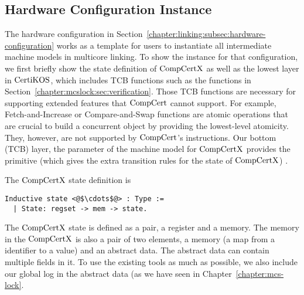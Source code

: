 
\subsection{Hardware Configuration Instance}
\label{chapter:certikos:subsec:hardware-configuration-instance}

The hardware configuration in Section~\ref{chapter:linking:subsec:hardware-configuration} works as a 
template for users to instantiate all intermediate machine models in multicore linking. 
To show the instance for that configuration,
we first briefly show the state definition of $\mathrm{CompCertX}$
as well as the lowest layer in $\mathrm{CertiKOS}$, which includes TCB functions such as the functions in Section~\ref{chapter:mcslock:sec:verification}.
Those TCB functions are 
necessary for supporting extended features that $\mathrm{CompCert}$ cannot support. 
For example, 
Fetch-and-Increase or Compare-and-Swap functions are atomic operations that are crucial to build a 
concurrent object by providing the lowest-level atomicity. 
They, however, are not supported by $\mathrm{CompCert}$'s instructions.
Our bottom (TCB) layer, the parameter of the machine model for $\mathrm{CompCertX}$ 
provides the primitive (which gives the extra transition rules for the state of $\mathrm{CompCertX}$) . 
%
%



The $\mathrm{CompCertX}$ state definition is
\begin{lstlisting}
Inductive state <@$\cdots$@> : Type :=
  | State: regset -> mem -> state.
\end{lstlisting}
The $\mathrm{CompCertX}$ state is defined as a pair, 
a register and a memory. 
The memory in the $\mathrm{CompCertX}$ is also a pair of two elements, 
a memory (a map from a identifier to a value) and an abstract data. 
The abstract data can contain 
multiple fields in it. 
To use the existing tools as much as possible, 
we also include our global log in the abstract data (as we have seen in Chapter~\ref{chapter:mcs-lock}.

